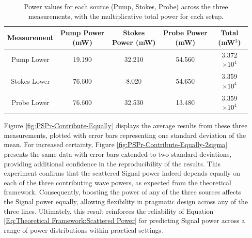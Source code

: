 \documentclass[%
  reprint,
  superscriptaddress,
  amsmath,amssymb,
  aps,
  prapplied,
]{revtex4-2}
\begin{document}
\begin{table}[h]
  \centering
  \renewcommand{\arraystretch}{1.2}
  \begin{tabular}{|c|c|c|c|c|}
    \hline
    \textbf{Measurement} & \textbf{Pump Power (mW)} & \textbf{Stokes Power (mW)} & \textbf{Probe Power (mW)} & \textbf{Total (mW$^{3}$)} \\
    \hline
    Pump Lower & 19.190 & 32.210 & 54.560 & 3.372 $\times 10^{4}$ \\
    Stokes Lower & 76.600 & 8.020 & 54.650 & 3.359 $\times 10^{4}$ \\
    Probe Lower & 76.600 & 32.530 & 13.480 & 3.359 $\times 10^{4}$ \\
    \hline
  \end{tabular}
    \caption{Power values for each source (Pump, Stokes, Probe) across the three measurements, with the multiplicative total power for each setup.}
    \label{tab:PSPr-Contribute-Equally}
\end{table}

Figure \ref{fig:PSPr-Contribute-Equally} displays the average results from these three measurements, plotted with error bars representing one standard deviation of the mean. For increased certainty, Figure \ref{fig:PSPr-Contribute-Equally-2sigma} presents the same data with error bars extended to two standard deviations, providing additional confidence in the reproducibility of the results. This experiment confirms that the scattered Signal power indeed depends equally on each of the three contributing wave powers, as expected from the theoretical framework. Consequently, boosting the power of any of the three sources affects the Signal power equally, allowing flexibility in pragmatic design across any of the three lines. Ultimately, this result reinforces the reliability of Equation \ref{Eq:Theoretical Framework:Scattered Power} for predicting Signal power across a range of power distributions within practical settings.

%
\end{document}
